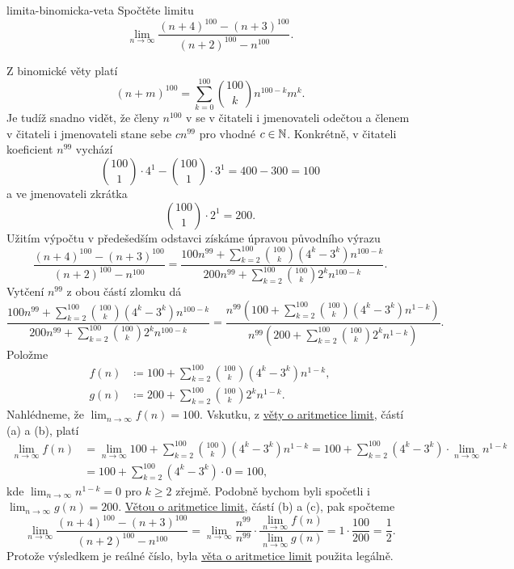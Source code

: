 \begin{problem}{}{limita-binomicka-veta}
 Spočtěte limitu
 \[
  \lim_{n \to \infty} \frac{(n+4)^{100} - (n+3)^{100}}{(n+2)^{100} - n^{100}}.
 \]
\end{problem}
\begin{probsol}
 Z binomické věty platí
 \[
  (n+m)^{100} = \sum_{k=0}^{100} \binom{100}{k} n^{100-k} m^{k}.
 \]
 Je tudíž snadno vidět, že členy $n^{100}$ v se v čitateli i jmenovateli odečtou
 a  členem v čitateli i jmenovateli stane sebe
 $cn^{99}$ pro vhodné $c \in \mathbb{N}$. Konkrétně, v čitateli koeficient $n^{99}$
 vychází
 \[
  \binom{100}{1} \cdot 4^{1} - \binom{100}{1} \cdot 3^{1} = 400 - 300 = 100
 \]
 a ve jmenovateli zkrátka
 \[
  \binom{100}{1} \cdot 2^{1} = 200.
 \]
 Užitím výpočtu v předešedším odstavci získáme úpravou původního výrazu
 \[
  \frac{(n+4)^{100} - (n+3)^{100}}{(n+2)^{100} - n^{100}} = \frac{100n^{99} +
  \sum_{k=2}^{100} \binom{100}{k}(4^{k} - 3^{k})n^{100 - k}}{200n^{99} +
 \sum_{k=2}^{100} \binom{100}{k} 2^{k}n^{100-k}}.
 \]
 Vytčení $n^{99}$ z obou částí zlomku dá
 \[
  \frac{100n^{99} + \sum_{k=2}^{100} \binom{100}{k}(4^{k} - 3^{k})n^{100 -
  k}}{200n^{99} + \sum_{k=2}^{100} \binom{100}{k} 2^{k}n^{100-k}}
  = \frac{n^{99}\left( 100 + \sum_{k=2}^{100} \binom{100}{k}(4^{k}-3^{k})n^{1-k}
  \right)}{n^{99}\left( 200 + \sum_{k=2}^{100} \binom{100}{k} 2^{k}n^{1-k}
  \right)}.
 \]
 Položme
 \begin{align*}
  f(n) & \coloneqq 100 + \sum_{k=2}^{100} \binom{100}{k} (4^{k} -
  3^{k})n^{1-k},\\
  g(n) & \coloneqq 200 + \sum_{k=2}^{100} \binom{100}{k} 2^{k}n^{1-k}.
 \end{align*}
 Nahlédneme, že $\lim_{n \to \infty} f(n) = 100$. Vskutku, z
 \hyperref[thm:aritmetika-limit]{věty o aritmetice limit}, částí (a) a (b),
 platí
 \begin{align*}
  \lim_{n \to \infty} f(n) &= \lim_{n \to \infty} 100 + \sum_{k=2}^{100}
 \binom{100}{k}(4^{k} - 3^{k})n^{1-k} = 100 + \sum_{k=2}^{100} (4^{k}-3^{k})
 \cdot \lim_{n \to \infty} n^{1-k}\\
                           &= 100 + \sum_{k=2}^{100} (4^{k} - 3^{k}) \cdot 0 =
                           100,
 \end{align*}
 kde $\lim_{n \to \infty} n^{1-k} = 0$ pro $k \geq 2$ zřejmě. Podobně bychom
 byli spočetli i $\lim_{n \to \infty} g(n) = 200$.
 \hyperref[thm:aritmetika-limit]{Větou o aritmetice limit}, částí (b) a (c), pak
 spočteme
 \[
  \lim_{n \to \infty} \frac{(n+4)^{100} - (n+3)^{100}}{(n+2)^{100} - n^{100}} =
  \lim_{n \to \infty} \frac{n^{99}}{n^{99}} \cdot \frac{\lim_{n \to \infty}
  f(n)}{\lim_{n \to \infty} g(n)} = 1 \cdot \frac{100}{200} = \frac{1}{2}.
 \]
 Protože výsledkem je reálné číslo, byla \hyperref[thm:aritmetika-limit]{věta o
 aritmetice limit} použita legálně.
\end{probsol}


